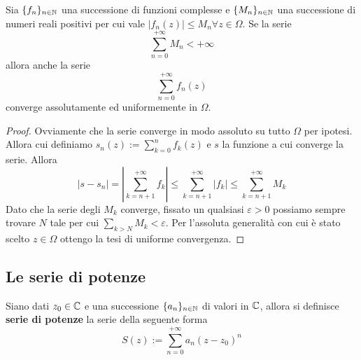 \begin{theorem}
	\label{thr:m-test-weierstrass} Sia $\{f_n\}_{n\in\mathbb{N}}$ una successione di funzioni complesse e $\{M_n\}_{n\in\mathbb{N}}$ una successione di numeri reali positivi per cui vale $|f_n(z)| \le M_n \forall z\in \Omega$. Se la serie 
	\begin{equation*}
		\sum_{n=0}^{+\infty} M_n < +\infty
	\end{equation*} 
	allora anche la serie 
	\begin{equation*}
		\sum_{n=0}^{+\infty} f_n(z)
	\end{equation*}
	converge assolutamente ed uniformemente in $\Omega$.
\end{theorem}
\begin{proof}
	Ovviamente che la serie converge in modo assoluto su tutto $\Omega$ per ipotesi. Allora cui definiamo $s_n(z) := \sum_{k=0}^n f_k(z)$ e $s$ la funzione a cui converge la serie. Allora
	\begin{equation*}
		|s - s_n| = \left|\sum_{k=n+1}^{+\infty} f_k\right| \le \sum_{k=n+1}^{+\infty} \left|f_k\right| \le \sum_{k=n+1}^{+\infty} M_k
	\end{equation*}
	Dato che la serie degli $M_k$ converge, fissato un qualsiasi $\varepsilon > 0$ possiamo sempre trovare $N$ tale per cui $\sum_{k>N} M_k < \varepsilon$. Per l'assoluta generalità con cui è stato scelto $z \in \Omega$ ottengo la tesi di uniforme convergenza. 
\end{proof}


\subsection{\textcolor{AnComp}{\textbf{Le serie di potenze}}}


\begin{definition}
	\label{defn:serie-di-potenze}
	Siano dati $z_0 \in \mathbb{C}$ e una successione $\{a_n\}_{n\in \mathbb{N}}$ di valori in $\mathbb{C}$, allora si definisce \textbf{serie di potenze} la serie della seguente forma
	\begin{equation*}
		S(z) := \sum_{n=0}^{+\infty} a_n(z-z_0)^n
	\end{equation*}
\end{definition}

